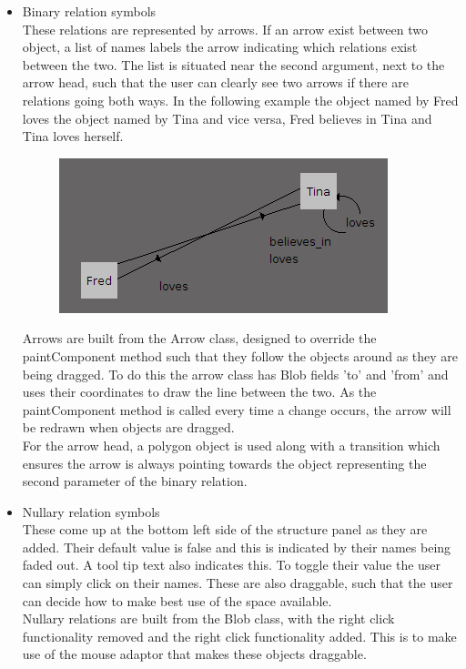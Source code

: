 \documentclass{report}
\begin{document}
\begin{enumerate}
\begin{itemize}
\item Binary relation symbols \\
These relations are represented by arrows. If an arrow exist between two object, 
a list of names labels the arrow indicating which relations exist between the 
two. The list is situated near the second argument, next to the arrow head, such 
that the user can clearly see two arrows if there are relations going both ways. 
In the following example the object named by Fred loves the object named by Tina 
and vice versa, Fred believes in Tina and Tina loves herself.
\newpage
\begin{figure}[h!]
\centering \includegraphics[scale=0.7]{arrows.png}
\end{figure}

Arrows are built from the Arrow class, designed to override the paintComponent 
method such that they follow the objects around as they are being dragged. To
do this the arrow class has Blob fields 'to' and 'from' and uses their
coordinates to draw the line between the two. As the paintComponent method is 
called every time a change occurs, the arrow will be redrawn when objects
are dragged.\\
For the arrow head, a polygon object is used along with a transition which
ensures the arrow is always pointing towards the object representing the second
parameter of the binary relation.

\item Nullary relation symbols \\
These come up at the bottom left side of the structure panel as they are added. 
Their default value is false and this is indicated by their names being faded 
out. A tool tip text also indicates this. To toggle their value the user can 
simply click on their names. These are also draggable, such that the user can 
decide how to make best use of the space available. \\
Nullary relations are built from the Blob class, with the right click 
functionality removed and the right click functionality added. This is to make
use of the mouse adaptor that makes these objects draggable.


\end{itemize}
\end{enumerate}
\end{document}
